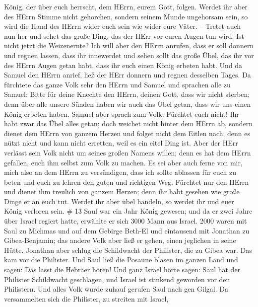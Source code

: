 König, der über euch herrscht, dem HErrn, eurem Gott, folgen.
 Werdet ihr aber des HErrn Stimme nicht gehorchen, sondern
seinem Munde ungehorsam sein, so wird die Hand des HErrn wider euch sein
wie wider eure Väter. --  Tretet auch nun her und sehet das
große Ding, das der HErr vor euren Augen tun wird.  Ist
nicht jetzt die Weizenernte? Ich will aber den HErrn anrufen, dass er
soll donnern und regnen lassen, dass ihr innewerdet und sehen sollt das
große Übel, das ihr vor des HErrn Augen getan habt, dass ihr euch einen
König erbeten habt.  Und da Samuel den HErrn anrief, ließ
der HErr donnern und regnen desselben Tages. Da fürchtete das ganze Volk
sehr den HErrn und Samuel  und sprachen alle zu Samuel:
Bitte für deine Knechte den HErrn, deinen Gott, dass wir nicht sterben;
denn über alle unsere Sünden haben wir auch das Übel getan, dass wir uns
einen König erbeten haben.  Samuel aber sprach zum Volk:
Fürchtet euch nicht! Ihr habt zwar das Übel alles getan; doch weichet
nicht hinter dem HErrn ab, sondern dienet dem HErrn von ganzem Herzen
 und folget nicht dem Eitlen nach; denn es nützt nicht und
kann nicht erretten, weil es ein eitel Ding ist.  Aber der
HErr verlässt sein Volk nicht um seines großen Namens willen; denn es
hat dem HErrn gefallen, euch ihm selbst zum Volk zu machen.
 Es sei aber auch ferne von mir, mich also an dem HErrn zu
versündigen, dass ich sollte ablassen für euch zu beten und euch zu
lehren den guten und richtigen Weg.  Fürchtet nur den HErrn
und dienet ihm treulich von ganzem Herzen; denn ihr habt gesehen wie
große Dinge er an euch tut.  Werdet ihr aber übel handeln,
so werdet ihr und euer König verloren sein. \# 13  Saul war
ein Jahr König gewesen; und da er zwei Jahre über Israel regiert hatte,
 erwählte er sich 3000 Mann aus Israel. 2000 waren mit Saul
zu Michmas und auf dem Gebirge Beth-El und eintausend mit Jonathan zu
Gibea-Benjamin; das andere Volk aber ließ er gehen, einen jeglichen in
seine Hütte.  Jonathan aber schlug die Schildwacht der
Philister, die zu Gibea war. Das kam vor die Philister. Und Saul ließ
die Posaune blasen im ganzen Land und sagen: Das lasst die Hebräer
hören!  Und ganz Israel hörte sagen: Saul hat der Philister
Schildwacht geschlagen, und Israel ist stinkend geworden vor den
Philistern. Und alles Volk wurde zuhauf gerufen Saul nach gen Gilgal.
 Da versammelten sich die Philister, zu streiten mit Israel,
